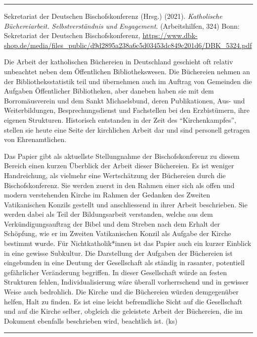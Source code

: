 \documentclass[a4paper,
fontsize=11pt,
oneside,
numbers=noperiodatend,
parskip=half-,
bibliography=totoc,
final
]{scrartcl}
\begin{document}
\begin{center}\rule{0.5\linewidth}{0.5pt}\end{center}

Sekretariat der Deutschen Bischofskonferenz (Hrsg.) (2021).
\emph{Katholische Büchereiarbeit. Selbstverständnis und Engagement}.
(Arbeitshilfen, 324) Bonn: Sekretariat der Deutschen Bischofskonferenz,
\url{https://www.dbk-shop.de/media/files_public/d9d2895a238a6c5d03453dc849c201d6/DBK_5324.pdf}

Die Arbeit der katholischen Büchereien in Deutschland geschieht oft
relativ unbeachtet neben dem Öffentlichen Bibliothekswesen. Die
Büchereien nehmen an der Bibliotheksstatistik teil und übernehmen auch
im Auftrag von Gemeinden die Aufgaben Öffentlicher Bibliotheken, aber
daneben haben sie mit dem Borromäusverein und dem Sankt Michaelsbund,
deren Publikationen, Aus- und Weiterbildungen, Besprechungsdienst und
Fachstellen bei den Erzbistümern, ihre eigenen Strukturen. Historisch
entstanden in der Zeit des \enquote{Kirchenkampfes}, stellen sie heute
eine Seite der kirchlichen Arbeit dar und sind personell getragen von
Ehrenamtlichen.

Das Papier gibt als aktuellste Stellungnahme der Bischofskonferenz zu
diesem Bereich einen kurzen Überblick der Arbeit dieser Büchereien. Es
ist weniger Handreichung, als vielmehr eine Wertschätzung der Büchereien
durch die Bischofskonferenz. Sie werden zuerst in den Rahmen einer sich
als offen und modern verstehenden Kirche im Rahmen der Gedanken des
Zweiten Vatikanischen Konzils gestellt und anschliessend in ihrer Arbeit
beschrieben. Sie werden dabei als Teil der Bildungsarbeit verstanden,
welche aus dem Verkündigungsauftrag der Bibel und dem Streben nach dem
Erhalt der Schöpfung, wie er im Zweiten Vatikanischen Konzil als Aufgabe
der Kirche bestimmt wurde. Für Nichtkatholik*innen ist das Papier auch
ein kurzer Einblick in eine gewisse Subkultur. Die Darstellung der
Aufgaben der Büchereien ist eingebunden in eine Deutung der Gesellschaft
als ständig in rasanter, potentiell gefährlicher Veränderung begriffen.
In dieser Gesellschaft würde an festen Strukturen fehlen,
Individualisierung wäre überall vorherrschend und in gewisser Weise auch
bedrohlich. Die Kirche und die Büchereien würden demgegenüber helfen,
Halt zu finden. Es ist eine leicht befremdliche Sicht auf die
Gesellschaft und auf die Kirche selber, obgleich die geleistete Arbeit
der Büchereien, die im Dokument ebenfalls beschrieben wird, beachtlich
ist. (ks)

\begin{center}\rule{0.5\linewidth}{0.5pt}\end{center}
\end{document}
